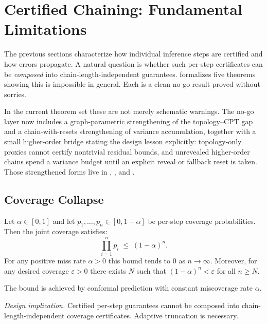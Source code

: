 \documentclass[11pt,openany]{report}
\begin{document}
\section{Certified Chaining: Fundamental Limitations}
\label{sec:certified-chaining-nogo}

The previous sections characterize how individual inference steps are
certified and how errors propagate.  A natural question is whether such
per-step certificates can be \emph{composed} into chain-length-independent
guarantees.  \xiPLN{} formalizes five theorems showing this is impossible in
general.  Each is a clean no-go result proved without sorries.

In the current theorem set these are not merely schematic warnings.
The no-go layer now includes a graph-parametric strengthening of the
topology--CPT gap and a chain-with-resets strengthening of variance
accumulation, together with a small higher-order bridge stating the design
lesson explicitly: topology-only proxies cannot certify nontrivial residual
bounds, and unrevealed higher-order chains spend a variance budget until an
explicit reveal or fallback reset is taken.  Those strengthened forms live in
,
, and
.

\subsection*{Coverage Collapse}

\boundarystart
\begin{theorem}
\label{thm:coverage-collapse}
Let $\alpha \in [0,1]$ and let $p_1,\dots,p_n \in [0, 1-\alpha]$ be
per-step coverage probabilities.  Then the joint coverage satisfies:
\[
  \prod_{i=1}^{n} p_i \;\le\; (1-\alpha)^n.
\]
For any positive miss rate $\alpha > 0$ this bound tends to $0$ as
$n \to \infty$.  Moreover, for any desired coverage $\varepsilon > 0$ there
exists $N$ such that $(1-\alpha)^n < \varepsilon$ for all $n \ge N$.

The bound is achieved by conformal prediction with constant miscoverage
rate $\alpha$.
\end{theorem}
\boundaryend

\textit{Design implication.}  Certified per-step guarantees cannot be
composed into chain-length-independent coverage certificates.  Adaptive
truncation is necessary.
\end{document}
